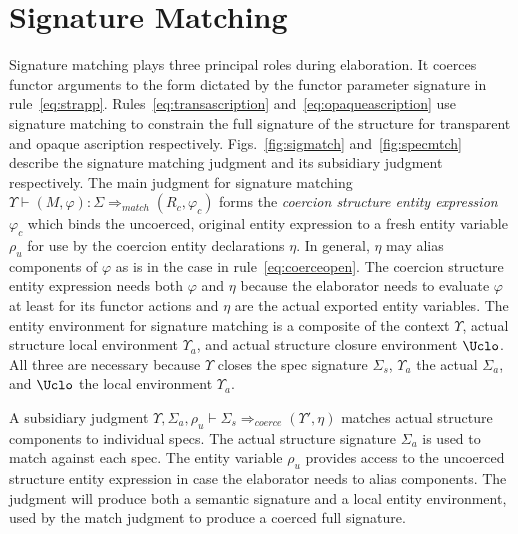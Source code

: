 \documentclass[9pt,nocopyrightspace, fleqn]{sigplanconf}
\begin{document}
\section{Signature Matching}\label{sec:sigmatch}
Signature matching plays three principal roles during elaboration. It
coerces functor arguments to the form dictated by the functor
parameter signature in
rule~\ref{eq:strapp}. Rules~\ref{eq:transascription}
and~\ref{eq:opaqueascription} use signature matching to constrain the
full signature of the structure for transparent and opaque ascription
respectively. Figs.~\ref{fig:sigmatch} and~\ref{fig:specmtch} describe 
the signature matching judgment and its subsidiary judgment respectively. The main judgment for signature matching $\Upsilon\vdash(M,\varphi):\Sigma\Rightarrow_{match} (R_c,\varphi_c)$ forms the \emph{coercion structure entity expression} $\varphi_c$ which binds the uncoerced, original entity expression to a fresh entity variable $\rho_u$ for use by the coercion entity declarations $\eta$. In general, $\eta$ may alias components of $\varphi$ as is in the case in rule~\ref{eq:coerceopen}.  The coercion structure entity expression needs both $\varphi$ and $\eta$ because the elaborator needs to evaluate $\varphi$ at least for its functor actions and $\eta$ are the actual exported entity variables. The entity environment for signature matching is a composite of the context $\Upsilon$, actual structure local environment $\Upsilon_a$, and actual structure closure environment $\Uclo$. All three are necessary because $\Upsilon$ closes the spec signature $\Sigma_s$, $\Upsilon_a$ the actual $\Sigma_a$, and $\Uclo$ the local environment $\Upsilon_a$. 

A subsidiary judgment $\Upsilon,\Sigma_a,\rho_u\vdash \Sigma_s \Rightarrow_{coerce} (\Upsilon', \eta)$ matches actual structure components to individual specs. The actual structure signature $\Sigma_a$ is used to match against each spec. The entity variable $\rho_u$ provides access to the uncoerced structure entity expression in case the elaborator needs to alias components. The judgment will produce both a semantic signature and a local entity environment, used by the match judgment to produce a coerced full signature. 
\end{document}
